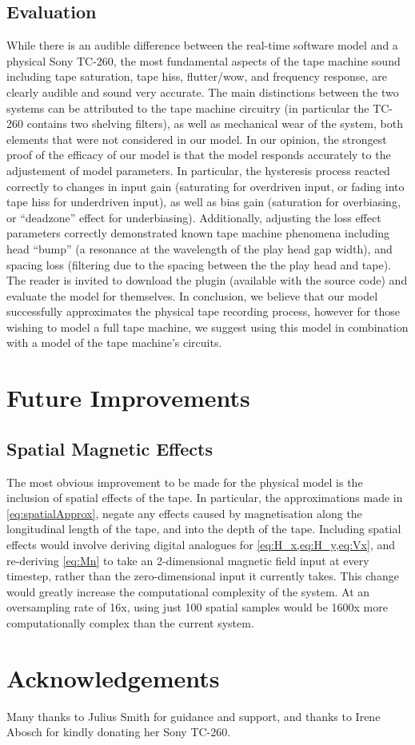 \documentclass[twoside,a4paper]{article}
\begin{document}
\subsection{Evaluation}
While there is an audible difference between the
real-time software model and a physical Sony
TC-260, the most fundamental aspects of the tape
machine sound including tape saturation, tape hiss, flutter/wow,
and frequency response, are clearly audible and sound
very accurate. The main distinctions between the two
systems can be attributed to the tape machine circuitry
(in particular the TC-260 contains two shelving filters),
as well as mechanical wear of the system, both elements
that were not considered in our model.
\newline\newline
In our opinion, the
strongest proof of the efficacy of our model is that the
model responds accurately to the adjustement of model parameters.
In particular, the hysteresis process
reacted correctly to changes in input gain (saturating for
overdriven input, or fading into tape hiss for underdriven
input), as well as bias gain (saturation for overbiasing, or
``deadzone'' effect for underbiasing).
Additionally, adjusting the loss effect parameters
correctly demonstrated known tape machine phenomena including
head ``bump'' (a resonance at the wavelength of the play
head gap width), and spacing loss (filtering due to the
spacing between the the play head and tape). The reader is
invited to download the plugin (available with the source code)
and evaluate the model for themselves. In conclusion, we believe
that our model successfully approximates the physical tape
recording process, however for those wishing to model a full
tape machine, we suggest using this model in combination with
a model of the tape machine's circuits.

\section{Future Improvements}
\subsection{Spatial Magnetic Effects}
The most obvious improvement to be made for the physical model
is the inclusion of spatial effects of the tape. In particular,
the approximations made in \cref{eq:spatialApprox}, negate any
effects caused by magnetisation along the longitudinal length
of the tape, and into the depth of the tape. Including spatial
effects would involve deriving digital analogues for
\cref{eq:H_x,eq:H_y,eq:Vx}, and re-deriving \cref{eq:Mn}
to take an 2-dimensional magnetic field input at every timestep,
rather than the zero-dimensional input it currently takes. This change
would greatly increase the computational complexity of the system.
At an oversampling rate of 16x,
using just 100 spatial samples would be 1600x more
computationally complex than the current system.

\section{Acknowledgements}
Many thanks to Julius Smith for guidance and support, and
thanks to Irene Abosch for kindly donating her Sony TC-260.

\nocite{*}


\end{document}
